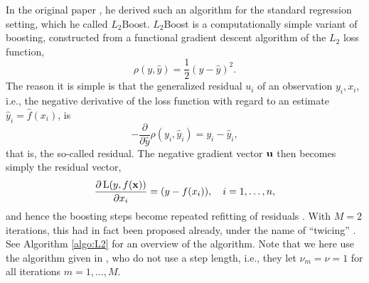 In the original paper \citep{friedman2001}, he derived such an algorithm for the standard regression setting, which he called $L_2$Boost. $L_2$Boost is a computationally simple variant of boosting, constructed from a functional gradient descent algorithm of the $L_2$ loss function,
\begin{equation*}
    \rho(y, \hat{y})=\frac{1}{2}(y-\hat{y})^2.
\end{equation*}
The reason it is simple is that the generalized residual $u_i$ of an observation $y_i,x_i$, i.e., the negative derivative of the loss function with regard to an estimate $\hat{y}_i=\hat{f}(x_i)$, is
\begin{equation*}
    -\frac{\partial}{\partial\hat{y}}\rho(y_i, \hat{y}_i)=y_i-\hat{y}_i,
\end{equation*}
that is, the so-called residual. The negative gradient vector $\mathbf{u}$ then becomes simply the residual vector,
\begin{equation*}
    \frac{\partial\operatorname{L}(y,f(\mathbf{x}))}{\partial x_i}=(y-f(x_i)),\quad i=1,\dotsc,n,
\end{equation*}
and hence the boosting steps become repeated refitting of residuals \citep{friedman2001,buhlmann-yu}. With $M=2$ iterations, this had in fact been proposed already, under the name of ``twicing'' \citep{tukey}. See Algorithm \ref{algo:L2} for an overview of the algorithm. Note that we here use the algorithm given in \citet{buhlmann-yu}, who do not use a step length, i.e., they let $\nu_m=\nu=1$ for all iterations $m=1,\ldots,M$.
